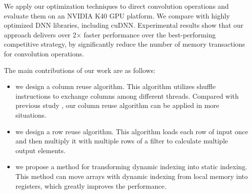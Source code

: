 We apply our optimization techniques to direct convolution operations and evaluate them on an NVIDIA K40 GPU platform.
We compare with highly optimized DNN libraries, including cuDNN. Experimental results show that our approach delivers
over 2$\times$ faster performance over the best-performing competitive strategy, by significantly reduce the number of
memory transactions for convolution operations.



The main contributions of our work are as follows:
\begin{itemize}
  \item we design a column reuse algorithm. This algorithm utilizes shuffle instructions to exchange columns among different threads. Compared
      with previous study \cite{vasilache2014fast}, our column reuse algorithm can be applied in more situations.
  \item we design a row reuse algorithm. This algorithm loads each row of input once and then multiply it with multiple rows of a filter
      to calculate multiple output elements.
  \item we propose a method for transforming dynamic indexing into static indexing. This method can move arrays with dynamic indexing
      from local memory into registers, which greatly improves the performance.
\end{itemize}

